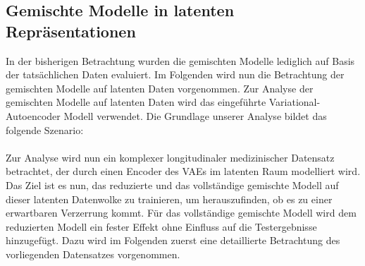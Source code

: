 \documentclass[%
thesis=student,%
coverpage=false,%
titlepage=false,%
headmarks=true, %
german,%
font=libertine, %
math=newpxtx, %
BCOR=5mm,%
coverBCOR=11mm%
]{tumbook}
\theoremstyle{break}
\begin{document}
\subsection{Gemischte Modelle in latenten Repräsentationen}
In der bisherigen Betrachtung wurden die gemischten Modelle lediglich auf Basis der tatsächlichen Daten evaluiert. Im Folgenden wird nun die Betrachtung der gemischten Modelle auf latenten Daten vorgenommen. Zur Analyse der gemischten Modelle auf latenten Daten wird das eingeführte Variational-Autoencoder Modell verwendet. Die Grundlage unserer Analyse bildet das folgende Szenario: \\
\\
Zur Analyse wird nun ein komplexer longitudinaler medizinischer Datensatz betrachtet, der durch einen Encoder des VAEs im latenten Raum modelliert wird. Das Ziel ist es nun, das reduzierte und das vollständige gemischte Modell auf dieser latenten Datenwolke zu trainieren, um herauszufinden, ob es zu einer erwartbaren Verzerrung kommt. Für das vollständige gemischte Modell wird dem reduzierten Modell ein fester Effekt ohne Einfluss auf die Testergebnisse hinzugefügt. Dazu wird im Folgenden zuerst eine detaillierte Betrachtung des vorliegenden Datensatzes vorgenommen.
\end{document}
